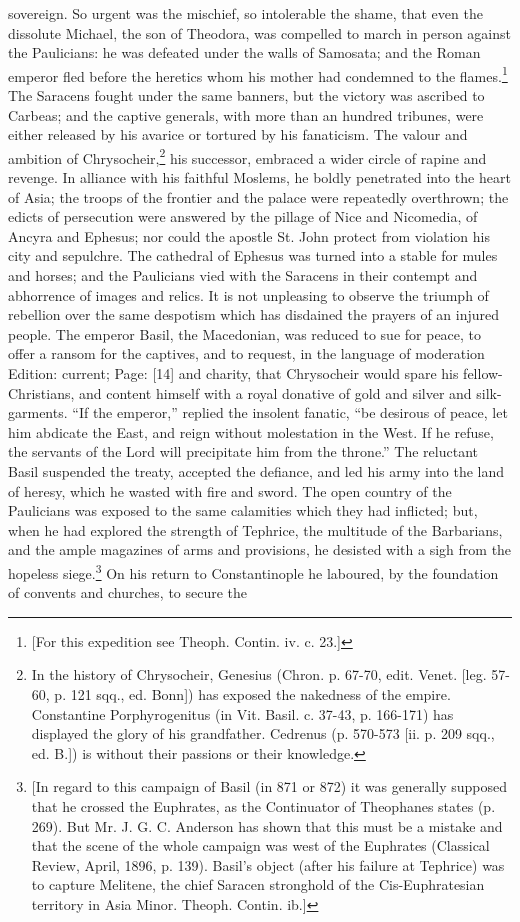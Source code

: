sovereign. So urgent was the mischief, so intolerable the shame, that even the dissolute Michael, the son of Theodora, was compelled to march in person against the Paulicians: he was defeated under the walls of Samosata; and the Roman emperor fled before the heretics whom his mother had condemned to the flames.\footnote{[For this expedition see Theoph. Contin. iv. c. 23.]} The Saracens fought under the same banners, but the victory was ascribed to Carbeas; and the captive generals, with more than an hundred tribunes, were either released by his avarice or tortured by his fanaticism. The valour and ambition of Chrysocheir,\footnote{In the history of Chrysocheir, Genesius (Chron. p. 67-70, edit. Venet. [leg. 57-60, p. 121 sqq., ed. Bonn]) has exposed the nakedness of the empire. Constantine Porphyrogenitus (in Vit. Basil. c. 37-43, p. 166-171) has displayed the glory of his grandfather. Cedrenus (p. 570-573 [ii. p. 209 sqq., ed. B.]) is without their passions or their knowledge.} his successor, embraced a wider circle of rapine and revenge. In alliance with his faithful Moslems, he boldly penetrated into the heart of Asia; the troops of the frontier and the palace were repeatedly overthrown; the edicts of persecution were answered by the pillage of Nice and Nicomedia, of Ancyra and Ephesus; nor could the apostle St. John protect from violation his city and sepulchre. The cathedral of Ephesus was turned into a stable for mules and horses; and the Paulicians vied with the Saracens in their contempt and abhorrence of images and relics. It is not unpleasing to observe the triumph of rebellion over the same despotism which has disdained the prayers of an injured people. The emperor Basil, the Macedonian, was reduced to sue for peace, to offer a ransom for the captives, and to request, in the language of moderation Edition: current; Page: [14] and charity, that Chrysocheir would spare his fellow-Christians, and content himself with a royal donative of gold and silver and silk-garments. \texthebrew{“}If the emperor,\texthebrew{}” replied the insolent fanatic, \texthebrew{“}be desirous of peace, let him abdicate the East, and reign without molestation in the West. If he refuse, the servants of the Lord will precipitate him from the throne.\texthebrew{}” The reluctant Basil suspended the treaty, accepted the defiance, and led his army into the land of heresy, which he wasted with fire and sword. The open country of the Paulicians was exposed to the same calamities which they had inflicted; but, when he had explored the strength of Tephrice, the multitude of the Barbarians, and the ample magazines of arms and provisions, he desisted with a sigh from the hopeless siege.\footnote{[In regard to this campaign of Basil (in 871 or 872) it was generally supposed that he crossed the Euphrates, as the Continuator of Theophanes states (p. 269). But Mr. J. G. C. Anderson has shown that this must be a mistake and that the scene of the whole campaign was west of the Euphrates (Classical Review, April, 1896, p. 139). Basil\texthebrew{}’s object (after his failure at Tephrice) was to capture Melitene, the chief Saracen stronghold of the Cis-Euphratesian territory in Asia Minor. Theoph. Contin. ib.]} On his return to Constantinople he laboured, by the foundation of convents and churches, to secure the 
